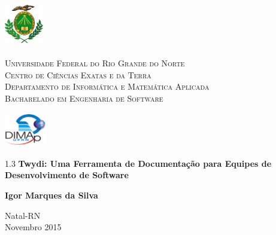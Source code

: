 
\begin{titlepage}
	\begin{center}

		\begin{minipage}{2cm}
			\begin{center}
				\includegraphics[width=1.7cm, height=2.0cm]{Imagens/Brasao-UFRN.jpg}
			\end{center}
		\end{minipage}
		\begin{minipage}{11cm}
			\begin{center}
				\begin{espacosimples}
					{\small \textsc{Universidade Federal do Rio Grande do Norte}			\\
							  \textsc{Centro de Ciências Exatas e da Terra}						\\
							  \textsc{Departamento de Informática e Matemática Aplicada}	\\
							  \textsc{Bacharelado em Engenharia de Software}}
				\end{espacosimples}
			\end{center}
		\end{minipage}
		\begin{minipage}{2cm}
			\begin{center}
				\includegraphics[width=1.8cm, height=1.5cm]{Imagens/Logotipo-DIMAp.jpg}
			\end{center}
		\end{minipage}

		\vspace{5cm}

		{\setlength{\baselineskip}%
		{1.3\baselineskip}
		{\LARGE \textbf{Twydi: Uma Ferramenta de Documentação para Equipes de Desenvolvimento de Software}}\par}

		\vspace{4cm}

		{\large \textbf{Igor Marques da Silva}}

		\vspace{7cm}

		Natal-RN\\Novembro 2015
	\end{center}
\end{titlepage}
